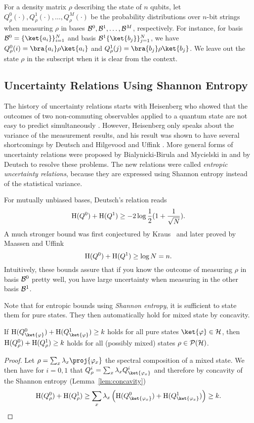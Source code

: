 For a density matrix $\rho$ describing the state of $n$ qubits, let
$Q_\rho^0(\cdot), Q_\rho^1(\cdot), \ldots, Q_\rho^M(\cdot)$ be the
probability distributions over $n$-bit strings when measuring $\rho$
in bases $\mathcal{B}^{0}, \mathcal{B}^{1}, \ldots, \mathcal{B}^{M}$, respectively. For instance,
for basis $\Ba{0} = \set{\ket{a_i}}_{i=1}^N$ and basis $\Ba{1}
\set{\ket{b_j}}_{j=1}^N$, we have $Q_\rho^0(i) =
\bra{a_i}\rho\ket{a_i}$ and $Q_\rho^1(j) = \bra{b_j}\rho\ket{b_j}$. We
leave out the state $\rho$ in the subscript when it is clear from the
context.

\subsection{Uncertainty Relations Using Shannon Entropy}
The history of uncertainty relations starts with Heisenberg who showed
that the outcomes of two non-commuting observables applied to a
quantum state are not easy to predict simultaneously
\cite{Heisenberg27}. However, Heisenberg only speaks about the
variance of the measurement results, and his result was shown to have
several shortcomings by Deutsch \cite{Deutsch83} and Hilgevood and Uffink
\cite{HU88}. More general forms of uncertainty relations were proposed
by Bialynicki-Birula and Mycielski in \cite{BM75} and by Deutsch
\cite{Deutsch83} to resolve these problems.  The new relations were
called {\em entropic uncertainty relations}, because they are
expressed using Shannon entropy instead of the statistical variance.

For mutually unbiased bases, Deutsch's relation reads
\[
\operatorname{H}(Q^0) + \operatorname{H}(Q^1) \geq -2 \log{ \frac12 (1+\frac{1}{\sqrt{N}}) }.
\]
A much stronger bound was first conjectured by Kraus~\cite{Kraus87} and later proved
by Maassen and Uffink~\cite{MU88}
\begin{equation} \label{eq:maassenuffink}
\operatorname{H}(Q^0) + \operatorname{H}(Q^1) \geq \log{N}=n. 
\end{equation}
Intuitively, these bounds assure that if you know the outcome of
measuring $\rho$ in basis $\mathcal{B}^{0}$ pretty well, you have large
uncertainty when measuring in the other basis $\mathcal{B}^{1}$. 

Note that for entropic bounds using \emph{Shannon entropy}, it is
sufficient to state them for pure states. They then automatically hold
for mixed state by concavity.
\begin{lemma}
  If $\H(Q_{\ket{\varphi}}^0) + \H(Q_{\ket{\varphi}}^1) \geq k$ holds
  for all pure states $\ket{\varphi} \in \cH$, then $\operatorname{H}(Q_{\rho}^0) +
  \operatorname{H}(Q_{\rho}^1) \geq k$ holds for all (possibly mixed) states $\rho \in \mathcal{P}(\mathcal{H})$.
\end{lemma}
\begin{proof}
Let $\rho=\sum_x \lambda_x \proj{\varphi_x}$ the spectral composition
of a mixed state. We then have for $i=0,1$ that $Q_{\rho}^i=\sum_x
\lambda_x Q_{\ket{\varphi_x}}^i$ and therefore by concavity of the
Shannon entropy (Lemma~\ref{lem:concavity})
\[
\H(Q_{\rho}^0) + \H(Q_{\rho}^1) \geq \sum_x \lambda_x \left( \H(Q_{\ket{\varphi_x}}^0)
+ \H(Q_{\ket{\varphi_x}}^1) \right) \geq k.\]
\end{proof}


